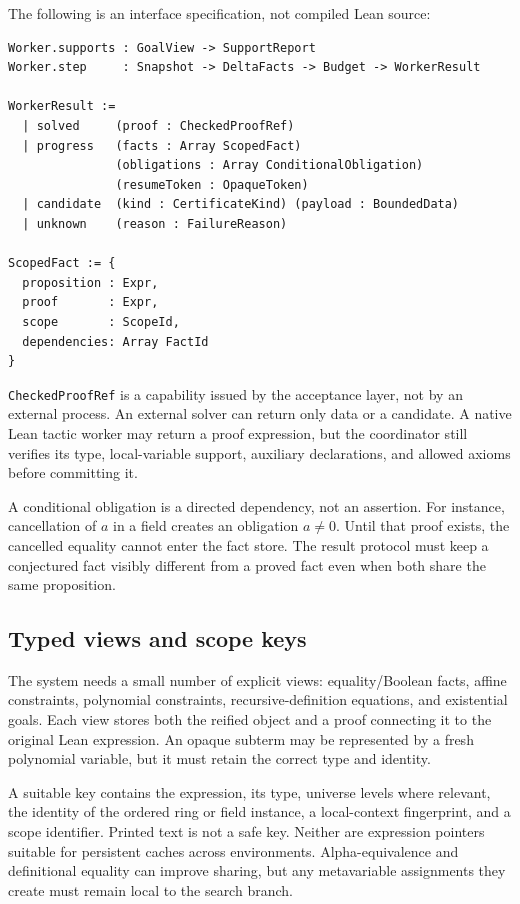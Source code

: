 \documentclass[11pt,a4paper]{article}
\theoremstyle{definition}
\newcommand{\code}[1]{\texttt{#1}}
\begin{document}
The following is an interface specification, not compiled Lean source:

\begin{lstlisting}
Worker.supports : GoalView -> SupportReport
Worker.step     : Snapshot -> DeltaFacts -> Budget -> WorkerResult

WorkerResult :=
  | solved     (proof : CheckedProofRef)
  | progress   (facts : Array ScopedFact)
               (obligations : Array ConditionalObligation)
               (resumeToken : OpaqueToken)
  | candidate  (kind : CertificateKind) (payload : BoundedData)
  | unknown    (reason : FailureReason)

ScopedFact := {
  proposition : Expr,
  proof       : Expr,
  scope       : ScopeId,
  dependencies: Array FactId
}
\end{lstlisting}

\code{CheckedProofRef} is a capability issued by the acceptance layer, not by an external process. An external solver can return only data or a candidate. A native Lean tactic worker may return a proof expression, but the coordinator still verifies its type, local-variable support, auxiliary declarations, and allowed axioms before committing it.

A conditional obligation is a directed dependency, not an assertion. For instance, cancellation of $a$ in a field creates an obligation $a\ne0$. Until that proof exists, the cancelled equality cannot enter the fact store. The result protocol must keep a conjectured fact visibly different from a proved fact even when both share the same proposition.

\subsection{Typed views and scope keys}

The system needs a small number of explicit views: equality/Boolean facts, affine constraints, polynomial constraints, recursive-definition equations, and existential goals. Each view stores both the reified object and a proof connecting it to the original Lean expression. An opaque subterm may be represented by a fresh polynomial variable, but it must retain the correct type and identity.

A suitable key contains the expression, its type, universe levels where relevant, the identity of the ordered ring or field instance, a local-context fingerprint, and a scope identifier. Printed text is not a safe key. Neither are expression pointers suitable for persistent caches across environments. Alpha-equivalence and definitional equality can improve sharing, but any metavariable assignments they create must remain local to the search branch.
\end{document}
